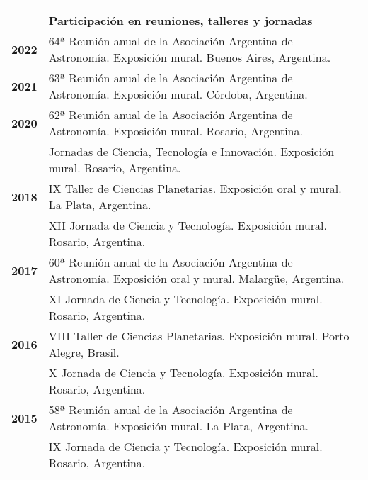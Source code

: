 \documentclass[12pt,a4paper]{article}
\begin{document}
\begin{longtable}[t]{r p{12cm}}
  & \\
  & \textbf{Participación en reuniones, talleres y jornadas} \\
 \cline{2-2}
 \textbf{2022} & 64ª Reunión anual de la Asociación Argentina de Astronomía. Exposición mural. Buenos Aires, Argentina. \\
 \textbf{2021} & 63ª Reunión anual de la Asociación Argentina de Astronomía. Exposición mural. Córdoba, Argentina. \\
 \textbf{2020} & 62ª Reunión anual de la Asociación Argentina de Astronomía. Exposición mural. Rosario, Argentina. \\
               & Jornadas de Ciencia, Tecnología e Innovación. Exposición mural. Rosario, Argentina. \\
 \textbf{2018} & IX Taller de Ciencias Planetarias. Exposición oral y mural. La Plata, Argentina. \\
               & XII Jornada de Ciencia y Tecnología. Exposición mural. Rosario, Argentina. \\
 \textbf{2017} & 60ª Reunión anual de la Asociación Argentina de Astronomía. Exposición oral y mural. Malargüe, Argentina. \\
               & XI Jornada de Ciencia y Tecnología. Exposición mural. Rosario, Argentina. \\
 \textbf{2016} & VIII Taller de Ciencias Planetarias. Exposición mural. Porto Alegre, Brasil. \\
               & X Jornada de Ciencia y Tecnología. Exposición mural. Rosario, Argentina. \\
 \textbf{2015} & 58ª Reunión anual de la Asociación Argentina de Astronomía. Exposición mural. La Plata, Argentina. \\
               & IX Jornada de Ciencia y Tecnología. Exposición mural. Rosario, Argentina. \\


\end{longtable}
\end{document}
